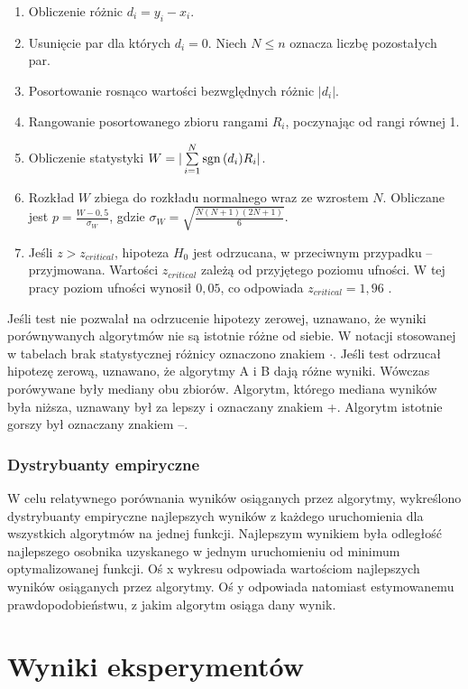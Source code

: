 \documentclass[a4paper,onecolumn,oneside,11pt,wide,floatssmall]{mwrep}
\def\sgn{{\rm sgn}\,}
\theoremstyle{definition}
\theoremstyle{plain}%
\theoremstyle{remark}
\begin{document}
\begin{enumerate}
 \item Obliczenie różnic $d_i = y_i - x_i$.
 \item Usunięcie par dla których $d_i = 0$. Niech $N \leq n$ oznacza liczbę pozostałych par.
 \item Posortowanie rosnąco wartości bezwględnych różnic $|d_i|$.
 \item Rangowanie posortowanego zbioru rangami $R_i$, poczynając od rangi równej 1. 
 \item Obliczenie statystyki $W = |\sum\limits_{i=1}^{N} \sgn(d_i)R_i|$.
 \item Rozkład $W$ zbiega do rozkładu normalnego wraz ze wzrostem $N$. Obliczane jest
 $p = \frac{W - 0,5}{\sigma_W}$, gdzie $\sigma_W = \sqrt{\frac{N(N+1)(2N+1)}{6}}.$ 
 \item Jeśli $z > z_{critical}$, hipoteza $H_0$ jest odrzucana, w przeciwnym przypadku -- przyjmowana. 
Wartości $z_{critical}$ zależą od przyjętego poziomu ufności. 
W tej pracy poziom ufności wynosił $0,05$, co odpowiada $z_{critical}=1,96$ \cite{lowry}.  
\end{enumerate}

Jeśli test nie pozwalał na odrzucenie hipotezy zerowej, uznawano, że wyniki porównywanych algorytmów
nie są istotnie różne od siebie. W notacji stosowanej w tabelach brak statystycznej różnicy oznaczono
znakiem $\cdotp$.
Jeśli test odrzucał hipotezę zerową, uznawano, że algorytmy A i B dają różne wyniki.
Wówczas porówywane były mediany obu zbiorów. Algorytm, którego mediana wyników była niższa,
uznawany był za lepszy i oznaczany znakiem +. Algorytm istotnie gorszy był oznaczany znakiem --.

\subsection{Dystrybuanty empiryczne}

W celu relatywnego porównania wyników osiąganych przez algorytmy, 
wykreślono dystrybuanty empiryczne najlepszych wyników z każdego uruchomienia 
dla wszystkich algorytmów na jednej funkcji. Najlepszym wynikiem była odległość najlepszego 
osobnika uzyskanego w jednym uruchomieniu od minimum optymalizowanej funkcji. Oś x wykresu
odpowiada wartościom najlepszych wyników osiąganych przez algorytmy. Oś y odpowiada natomiast 
estymowanemu prawdopodobieństwu, z jakim algorytm osiąga dany wynik.

\chapter{Wyniki eksperymentów}
\end{document}
